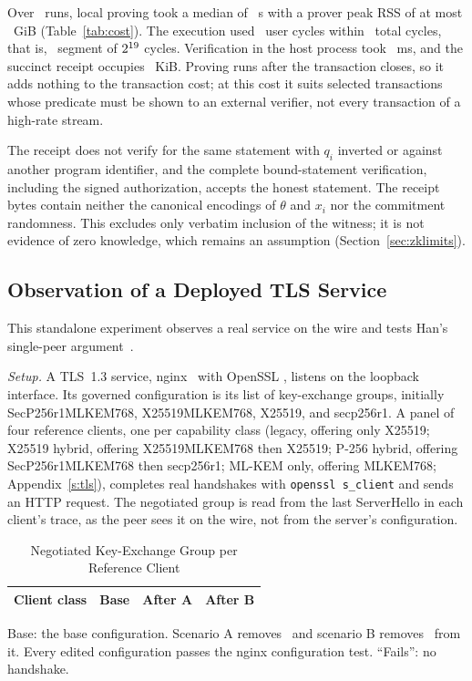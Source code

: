 \documentclass[journal]{IEEEtran}
\newcommand{\code}[1]{\texttt{\footnotesize #1}}
\begin{document}
Over \ZkRunsWord\ runs, local proving took a median of \ZkProveMed~s with a prover peak RSS of at most \ZkPeakGiB~GiB (Table~\ref{tab:cost}). The execution used \ZkUserCycles\ user cycles within \ZkCycles\ total cycles, that is, \ZkSegmentsWord\ segment of $2^{19}$ cycles. Verification in the host process took \ZkVerifyMs~ms, and the succinct receipt occupies \ZkReceiptKiB~KiB. Proving runs after the transaction closes, so it adds nothing to the transaction cost; at this cost it suits selected transactions whose predicate must be shown to an external verifier, not every transaction of a high-rate stream.

The receipt does not verify for the same statement with $q_i$ inverted or against another program identifier, and the complete bound-statement verification, including the signed authorization, accepts the honest statement. The receipt bytes contain neither the canonical encodings of $\theta$ and $x_i$ nor the commitment randomness. This excludes only verbatim inclusion of the witness; it is not evidence of zero knowledge, which remains an assumption (Section~\ref{sec:zklimits}).

\subsection{Observation of a Deployed TLS Service}
\label{sec:tls}
This standalone experiment observes a real service on the wire and tests Han's single-peer argument~\cite{han}.

\emph{Setup.} A TLS~1.3 service, nginx \TlsNginx\ with OpenSSL \TlsOpenssl, listens on the loopback interface. Its governed configuration is its list of key-exchange groups, initially SecP256r1MLKEM768, X25519MLKEM768, X25519, and secp256r1. A panel of four reference clients, one per capability class (legacy, offering only X25519; X25519 hybrid, offering X25519MLKEM768 then X25519; P-256 hybrid, offering SecP256r1MLKEM768 then secp256r1; ML-KEM only, offering MLKEM768; Appendix~\ref{s:tls}), completes real handshakes with \code{openssl s\_client} and sends an HTTP request. The negotiated group is read from the last ServerHello in each client's trace, as the peer sees it on the wire, not from the server's configuration.

\begin{table}[!t]
\caption{Negotiated Key-Exchange Group per Reference Client}
\label{tab:tls}
\centering
\scriptsize
\setlength{\tabcolsep}{2pt}
\begin{tabular}{@{}llll@{}}
\toprule
Client class & Base & After A & After B \\
\midrule

\end{tabular}
\par\smallskip\parbox{\linewidth}{\footnotesize Base: the base configuration. Scenario A removes \TlsRemovedA\ and scenario B removes \TlsRemovedB\ from it. Every edited configuration passes the nginx configuration test. ``Fails'': no handshake.}
\end{table}
\end{document}
